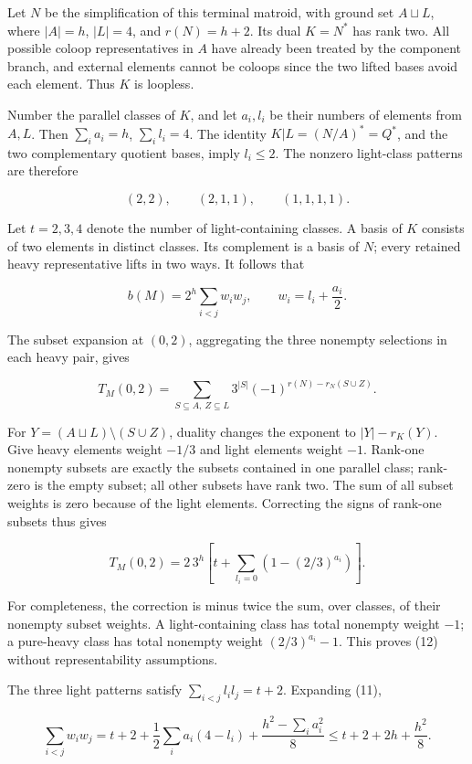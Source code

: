 \documentclass[11pt]{article}
\begin{document}
Let \(N\) be the simplification of this terminal matroid, with ground set \(A\sqcup L\), where \(|A|=h\), \(|L|=4\), and \(r(N)=h+2\). Its dual \(K=N^*\) has rank two. All possible coloop representatives in \(A\) have already been treated by the component branch, and external elements cannot be coloops since the two lifted bases avoid each element. Thus \(K\) is loopless.

Number the parallel classes of \(K\), and let \(a_i,l_i\) be their numbers of elements from \(A,L\). Then \(\sum_i a_i=h\), \(\sum_i l_i=4\). The identity \(K|L=(N/A)^*=Q^*\), and the two complementary quotient bases, imply \(l_i\le2\). The nonzero light-class patterns are therefore

\[
(2,2),\qquad(2,1,1),\qquad(1,1,1,1).
\]

Let \(t=2,3,4\) denote the number of light-containing classes. A basis of \(K\) consists of two elements in distinct classes. Its complement is a basis of \(N\); every retained heavy representative lifts in two ways. It follows that

\[
b(M)=2^h\sum_{i<j} w_iw_j,\qquad w_i=l_i+\frac{a_i}{2}. \tag{11}
\]

The subset expansion at \((0,2)\), aggregating the three nonempty selections in each heavy pair, gives

\[
T_M(0,2)=\sum_{S\subseteq A,\ Z\subseteq L}
3^{|S|}(-1)^{r(N)-r_N(S\cup Z)}.
\]

For \(Y=(A\sqcup L)\setminus(S\cup Z)\), duality changes the exponent to \(|Y|-r_K(Y)\). Give heavy elements weight \(-1/3\) and light elements weight \(-1\). Rank-one nonempty subsets are exactly the subsets contained in one parallel class; rank-zero is the empty subset; all other subsets have rank two. The sum of all subset weights is zero because of the light elements. Correcting the signs of rank-one subsets thus gives

\[
T_M(0,2)=2\,3^h\left[t+\sum_{l_i=0}\left(1-(2/3)^{a_i}\right)\right]. \tag{12}
\]

For completeness, the correction is minus twice the sum, over classes, of their nonempty subset weights. A light-containing class has total nonempty weight \(-1\); a pure-heavy class has total nonempty weight \((2/3)^{a_i}-1\). This proves (12) without representability assumptions.

The three light patterns satisfy \(\sum_{i<j}l_i l_j=t+2\). Expanding (11),

\[
\sum_{i<j}w_iw_j
=t+2+\frac12\sum_i a_i(4-l_i)+\frac{h^2-\sum_i a_i^2}{8}
\le t+2+2h+\frac{h^2}{8}. \tag{13}
\]
\end{document}
